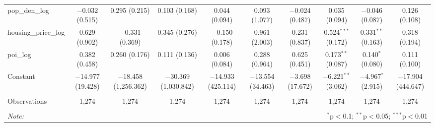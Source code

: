 \begin{table}[!htbp]
\begin{tabular}{@{\extracolsep{1pt}}lccccccccc}
  pop\_den\_log & $-$0.032 (0.515) & 0.295 (0.215) & 0.103 (0.168) & 0.044 (0.094) & 0.093 (1.077) & $-$0.024 (0.487) & 0.035 (0.094) & $-$0.046 (0.087) & 0.126 (0.108) \\ 
  housing\_price\_log & 0.629 (0.902) & $-$0.331 (0.369) & 0.345 (0.276) & $-$0.150 (0.178) & 0.961 (2.003) & 0.231 (0.837) & 0.524$^{***}$ (0.172) & 0.331$^{**}$ (0.163) & 0.318 (0.194) \\ 
  poi\_log & 0.382 (0.458) & 0.260 (0.176) & 0.111 (0.136) & 0.006 (0.084) & 0.288 (0.964) & 0.625 (0.451) & 0.173$^{**}$ (0.087) & 0.140$^{*}$ (0.080) & 0.111 (0.100) \\ 
  Constant & $-$14.977 (19.428) & $-$18.458 (1,256.362) & $-$30.369 (1,030.842) & $-$14.933 (425.114) & $-$13.554 (34.463) & $-$3.698 (17.672) & $-$6.221$^{**}$ (3.062) & $-$4.967$^{*}$ (2.915) & $-$17.904 (444.647) \\ 
 \hline \\[-1.8ex] 
Observations & 1,274 & 1,274 & 1,274 & 1,274 & 1,274 & 1,274 & 1,274 & 1,274 & 1,274 \\ 
\hline 
\hline \\[-1.8ex] 
\textit{Note:}  & \multicolumn{9}{r}{$^{*}$p$<$0.1; $^{**}$p$<$0.05; $^{***}$p$<$0.01} \\ 
\end{tabular} 
\end{table} 
